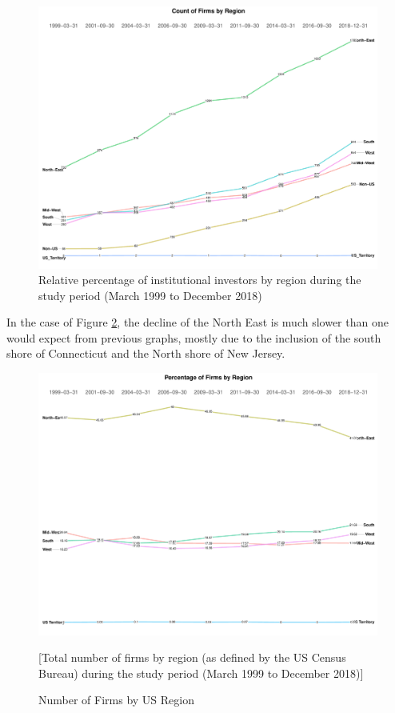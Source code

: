 \begin{figure}[h]
	\centering
	\includegraphics[width=1\linewidth]{Figures/ChapterIII/Count_firms_USA}
	\caption[Count of Institutional Investors by Region (as defined by the US Census Bureau) for the Period 1999 to 2018]{Relative percentage of institutional investors by region during the study period (March 1999 to December 2018)}
	\label{fig:countfirmsusa}
\end{figure}


In the case of Figure \ref{fig:Percentage_firms_Region_USA}, the decline of the North East is much slower than one would expect from previous graphs, mostly due to the inclusion of the south shore of Connecticut and the North shore of New Jersey. 
 
\begin{figure}[h]
	\includegraphics[width=1\linewidth]{Figures/ChapterIII/Percentage_firms_Region_USA}
	\caption{Number of Firms by US Region}[Total number of firms by region  (as defined by the US Census Bureau) during the study period (March 1999 to December 2018)]
	\label{fig:Percentage_firms_Region_USA}
\end{figure}

